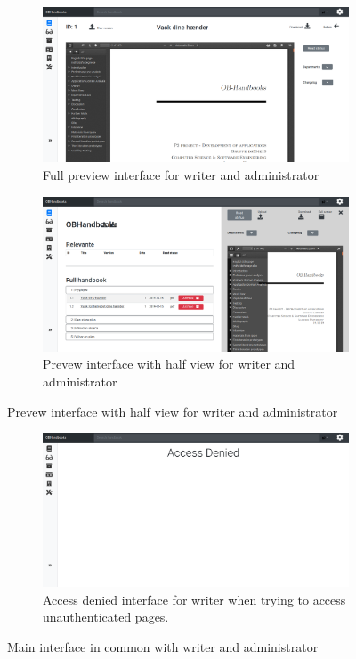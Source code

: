 \begin{figure}[H]\ContinuedFloat
	\centering
	\begin{subfigure}[b]{0.48\textwidth}
		\includegraphics[width=\textwidth]{billeder/iteration3Prototyper/Preview.png}
		\caption{Full preview interface for writer and administrator}
		\label{fig:5-FullPreviewWrite}
	\end{subfigure}
	\quad
	\begin{subfigure}[b]{0.48\textwidth}
		\includegraphics[width=\textwidth]{billeder/iteration3Prototyper/PreviewAdmin.png}
		\caption{Prevew interface with half view for writer and administrator}
		\label{fig:5-HalfPreviewWrite}
	\end{subfigure}
\end{figure}
\begin{figure}[H]\ContinuedFloat
	\centering
	\begin{subfigure}[b]{0.48\textwidth}
		\includegraphics[width=\textwidth]{billeder/iteration3Prototyper/AccessDenied.png}
		\caption{Access denied interface for writer when trying to access unauthenticated pages.}
		\label{fig:5-AccessDenied}
	\end{subfigure}
	\caption{Main interface in common with writer and administrator}\label{fig:5-MainWriteAdmin}
\end{figure}

